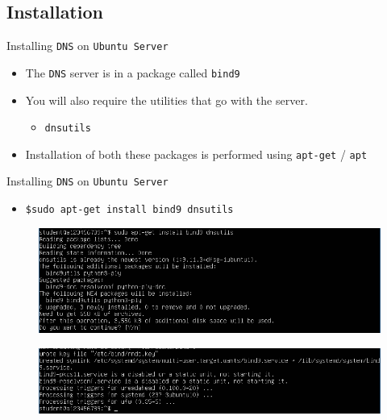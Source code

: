 \documentclass[aspectratio=169]{beamer}
\begin{document}
\subsection{Installation}
\begin{frame}{Installing \texttt{DNS} on \texttt{Ubuntu Server}}
  \begin{itemize}
    \item The \texttt{DNS} server is in a package called \texttt{bind9}
    \item You will also require the utilities that go with the server.
      \begin{itemize}
        \item \texttt{dnsutils}
      \end{itemize} 
    \item Installation of both these packages is performed using \texttt{apt-get} / \texttt{apt}
  \end{itemize}
\end{frame}

\begin{frame}{Installing \texttt{DNS} on \texttt{Ubuntu Server}}
  \begin{itemize}
    \item \texttt{\$sudo apt-get install bind9 dnsutils}
  \end{itemize}
  \begin{figure}
    \begin{center}
      \includegraphics[width=0.6\linewidth]{bind9-1.png}
    \end{center}
  \end{figure}
  \begin{figure}
    \begin{center}
      \includegraphics[width=0.6\linewidth]{bind9-2.png}
    \end{center}
  \end{figure}
\end{frame}
\end{document}
